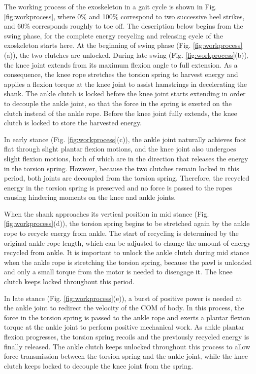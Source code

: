 \documentclass[10pt]{asme2ej}
\begin{document}
The working process of the exoskeleton in a gait cycle is shown in Fig. \ref{fig:workprocess}, where 0\% and 100\% correspond to two successive heel strikes, and 60\% corresponds roughly to toe off.
The description below begins from the swing phase, for the complete energy recycling and releasing cycle of the exoskeleton starts here.
At the beginning of swing phase (Fig. \ref{fig:workprocess}(a)), the two clutches are unlocked.
During late swing (Fig. \ref{fig:workprocess}(b)), the knee joint extends from its maximum flexion angle to full extension.
As a consequence, the knee rope stretches the torsion spring to harvest energy and applies a flexion torque at the knee joint to assist hamstrings in decelerating the shank.
The ankle clutch is locked before the knee joint starts extending in order to decouple the ankle joint, so that the force in the spring is exerted on the clutch instead of the ankle rope.
Before the knee joint fully extends, the knee clutch is locked to store the harvested energy.

In early stance (Fig. \ref{fig:workprocess}(c)), the ankle joint naturally achieves foot flat through slight plantar flexion motions, and the knee joint also undergoes slight flexion motions, both of which are in the direction that releases the energy in the torsion spring.
However, because the two clutches remain locked in this period, both joints are decoupled from the torsion spring.
Therefore, the recycled energy in the torsion spring is preserved and no force is passed to the ropes causing hindering moments on the knee and ankle joints.

When the shank approaches its vertical position in mid stance (Fig. \ref{fig:workprocess}(d)), the torsion spring begins to be stretched again by the ankle rope to recycle energy from ankle.
The start of recycling is determined by the original ankle rope length, which can be adjusted to change the amount of energy recycled from ankle.
It is important to unlock the ankle clutch during mid stance when the ankle rope is stretching the torsion spring, because the pawl is unloaded and only a small torque from the motor is needed to disengage it.
The knee clutch keeps locked throughout this period.

In late stance (Fig. \ref{fig:workprocess}(e)), a burst of positive power is needed at the ankle joint to redirect the velocity of the COM of body.
In this process, the force in the torsion spring is passed to the ankle rope and exerts a plantar flexion torque at the ankle joint to perform positive mechanical work.
As ankle plantar flexion progresses, the torsion spring recoils and the previously recycled energy is finally released.
The ankle clutch keeps unlocked throughout this process to allow force transmission between the torsion spring and the ankle joint, while the knee clutch keeps locked to decouple the knee joint from the spring.
\end{document}
